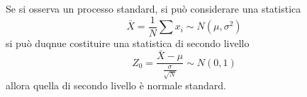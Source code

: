 Se si osserva un processo standard, si può considerare una statistica 
$$
\bar{X} = \frac{1}{N} \sum x_i \sim N(\mu,\sigma^2)
$$
si può duqnue costituire una statistica di secondo livello
$$
Z_0 = \frac{\bar{X} - \mu}{\frac{\sigma}{\sqrt{N}}} \sim N(0,1)
$$
allora quella di secondo livello è normale standard.

